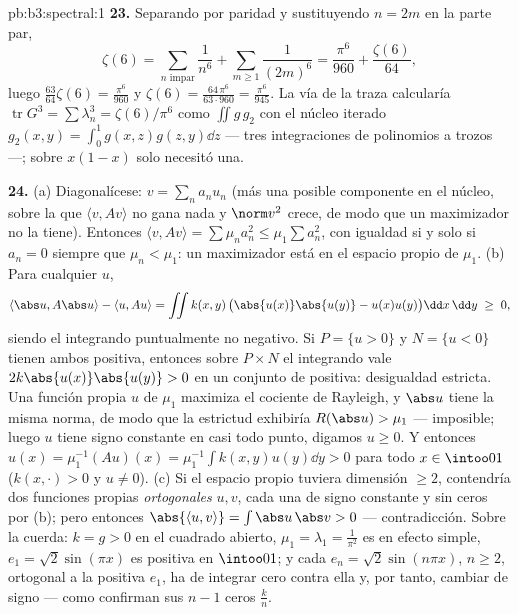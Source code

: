\begin{solution}{pb:b3:spectral:1}
\textbf{23.} Separando por paridad y sustituyendo $n = 2m$ en la parte
par,
\[
\zeta(6) = \sum_{n\text{ impar}}\frac1{n^6} +
\sum_{m\geq1}\frac1{(2m)^6}
= \frac{\pi^6}{960} + \frac{\zeta(6)}{64},
\]
luego $\frac{63}{64}\zeta(6) = \frac{\pi^6}{960}$ y $\zeta(6)
= \frac{64\,\pi^6}{63\cdot960} = \frac{\pi^6}{945}$. La vía de la traza
calcularía $\operatorname{tr}G^3 =
\sum\lambda_n^3 = \zeta(6)/\pi^6$ como $\iint g\,g_2$ con el núcleo
iterado $g_2(x,y) = \int_0^1g(x,z)g(z,y)\dd z$ --- tres integraciones de
polinomios a trozos ---; 
sobre $x(1-x)$ solo necesitó una.

\textbf{24.} (a) Diagonalícese: $v = \sum_na_nu_n$ (más una posible
componente en el núcleo, sobre la que $\langle v, Av\rangle$ no gana
nada y $\norm v^2$ crece, de modo que un maximizador no la tiene).
Entonces $\langle v, Av\rangle = \sum\mu_na_n^2 \leq
\mu_1\sum a_n^2$, con igualdad si y solo si $a_n = 0$ siempre que
$\mu_n < \mu_1$: un maximizador está en el espacio propio de $\mu_1$.
(b) Para cualquier $u$,
\[
\langle\abs u, A\abs u\rangle - \langle u, Au\rangle
= \iint k(x,y)\,\bigl(\abs{u(x)}\abs{u(y)} -
u(x)u(y)\bigr)\dd x\,\dd y \;\geq\; 0,
\]
siendo el integrando puntualmente no negativo. Si $P = \{u >
0\}$ y $N = \{u < 0\}$ tienen ambos
 positiva, entonces sobre
$P\times N$ el integrando vale $2k\abs{u(x)}\abs{u(y)} >
0$ en un conjunto de  positiva:
desigualdad estricta. Una función propia $u$ de $\mu_1$ maximiza el
cociente de Rayleigh, y $\abs u$ tiene la misma norma, de modo que la
estrictud exhibiría $R(\abs u) > \mu_1$ --- imposible; luego $u$ tiene
signo constante en casi todo punto, digamos $u \geq 0$. Y entonces
$u(x) = \mu_1^{-1}(Au)(x) =
\mu_1^{-1}\int k(x,y)u(y)\dd y > 0$ para todo $x \in
\intoo01$ ($k(x,\cdot) > 0$ y $u \neq 0$). (c) Si el espacio propio
tuviera dimensión $\geq 2$, contendría dos funciones propias
\emph{ortogonales} $u, v$, cada una de signo constante y sin ceros
 por (b); pero entonces
$\abs{\langle u, v\rangle} = \int\abs u\,\abs v > 0$ ---
contradicción. Sobre la cuerda: $k = g > 0$ en el cuadrado abierto,
$\mu_1 = \lambda_1 = \frac1{\pi^2}$ es en efecto simple,
$e_1 = \sqrt2\sin(\pi x)$ es positiva en $\intoo01$; y cada
$e_n = \sqrt2\sin(n\pi x)$, $n \geq 2$, ortogonal a la positiva $e_1$,
ha de integrar cero contra ella y, por tanto, cambiar de signo --- como
confirman sus $n - 1$ ceros
 $\frac kn$.


\end{solution}

